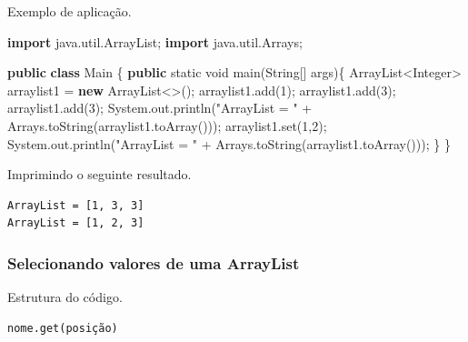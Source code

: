 \documentclass[
]{book}
\newenvironment{Shaded}{\begin{snugshade}}{\end{snugshade}}
\newcommand{\BuiltInTok}[1]{#1}
\newcommand{\DataTypeTok}[1]{\textcolor[rgb]{0.13,0.29,0.53}{#1}}
\newcommand{\DecValTok}[1]{\textcolor[rgb]{0.00,0.00,0.81}{#1}}
\newcommand{\FunctionTok}[1]{\textcolor[rgb]{0.00,0.00,0.00}{#1}}
\newcommand{\ImportTok}[1]{#1}
\newcommand{\KeywordTok}[1]{\textcolor[rgb]{0.13,0.29,0.53}{\textbf{#1}}}
\newcommand{\NormalTok}[1]{#1}
\newcommand{\StringTok}[1]{\textcolor[rgb]{0.31,0.60,0.02}{#1}}
\begin{document}
Exemplo de aplicação.

\begin{Shaded}
\begin{Highlighting}[]
\KeywordTok{import}\ImportTok{ java.util.ArrayList;}
\KeywordTok{import}\ImportTok{ java.util.Arrays;}

\KeywordTok{public} \KeywordTok{class}\NormalTok{ Main \{}
    \KeywordTok{public} \DataTypeTok{static} \DataTypeTok{void} \FunctionTok{main}\NormalTok{(}\BuiltInTok{String}\NormalTok{[] args)\{}
        \BuiltInTok{ArrayList}\NormalTok{<}\BuiltInTok{Integer}\NormalTok{> arraylist1 = }\KeywordTok{new} \BuiltInTok{ArrayList}\NormalTok{<>();}
\NormalTok{        arraylist1.}\FunctionTok{add}\NormalTok{(}\DecValTok{1}\NormalTok{);}
\NormalTok{        arraylist1.}\FunctionTok{add}\NormalTok{(}\DecValTok{3}\NormalTok{);}
\NormalTok{        arraylist1.}\FunctionTok{add}\NormalTok{(}\DecValTok{3}\NormalTok{);}
        \BuiltInTok{System}\NormalTok{.}\FunctionTok{out}\NormalTok{.}\FunctionTok{println}\NormalTok{(}\StringTok{"ArrayList = "}\NormalTok{ + }\BuiltInTok{Arrays}\NormalTok{.}\FunctionTok{toString}\NormalTok{(arraylist1.}\FunctionTok{toArray}\NormalTok{()));}
\NormalTok{        arraylist1.}\FunctionTok{set}\NormalTok{(}\DecValTok{1}\NormalTok{,}\DecValTok{2}\NormalTok{);}
        \BuiltInTok{System}\NormalTok{.}\FunctionTok{out}\NormalTok{.}\FunctionTok{println}\NormalTok{(}\StringTok{"ArrayList = "}\NormalTok{ + }\BuiltInTok{Arrays}\NormalTok{.}\FunctionTok{toString}\NormalTok{(arraylist1.}\FunctionTok{toArray}\NormalTok{()));}
\NormalTok{    \}}
\NormalTok{\}}
\end{Highlighting}
\end{Shaded}

Imprimindo o seguinte resultado.

\begin{verbatim}
ArrayList = [1, 3, 3]
ArrayList = [1, 2, 3]
\end{verbatim}

\hypertarget{selecionando-valores-de-uma-arraylist}{%
\subsubsection*{Selecionando valores de uma ArrayList}\label{selecionando-valores-de-uma-arraylist}}

Estrutura do código.

\begin{verbatim}
nome.get(posição)
\end{verbatim}
\end{document}
